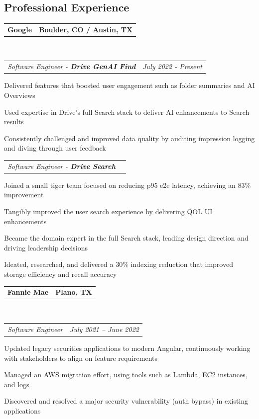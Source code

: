 \documentclass[11pt,letterpaper]{article}
\makeatletter
\newenvironment{indentsection}[1]%
{\begin{list}{}%
	{\setlength{\leftmargin}{#1}}%
	\item[]%
}
{\end{list}}
\newcommand{\headerrow}[2]
{\begin{tabular*}{\linewidth}{l@{\extracolsep{\fill}}r}
	#1 &
	#2 \\
\end{tabular*}}
\makeatother
\begin{document}
\subsection*{Professional Experience}
\begin{indentsection}{\parindent}
	\vspace{-0.4em}
	\headerrow
		{\textbf{Google}}
		{\textbf{Boulder, CO / Austin, TX}}
	\\
	\headerrow
		{\emph{Software Engineer - \textbf{Drive GenAI Find}}}
		{\emph{July 2022 - Present}}
	\begin{itemize*}
		\item Delivered features that boosted user engagement such as folder summaries and AI Overviews
		\item Used expertise in Drive's full Search stack to deliver AI enhancements to Search results
                   \item Consistently challenged and improved data quality by auditing impression logging and diving through user feedback
	\end{itemize*}
	\headerrow
		{\emph{Software Engineer - \textbf{Drive Search}}}
		{}
	\begin{itemize*}
		\item Joined a small tiger team focused on reducing p95 e2e latency, achieving an 83\% improvement
		\item Tangibly improved the user search experience by delivering QOL UI enhancements
		\item Became the domain expert in the full Search stack, leading design direction and driving leadership decisions
		\item Ideated, researched, and delivered a 30\% indexing reduction that improved storage efficiency and recall accuracy
	\end{itemize*}
\end{indentsection}
\begin{indentsection}{\parindent}
	\vspace{-0.4em}
	\headerrow
		{\textbf{Fannie Mae}}
		{\textbf{Plano, TX}}
	\\
	\headerrow
		{\emph{Software Engineer}}
		{\emph{July 2021 -- June 2022}}
	\begin{itemize*}
		\item Updated legacy securities applications to modern Angular, continuously working with stakeholders to align on feature requirements 
		\item Managed an AWS migration effort, using tools such as Lambda, EC2 instances, and logs
		\item Discovered and resolved a major security vulnerability (auth bypass) in existing applications
	\end{itemize*}
\end{indentsection}
\end{document}
